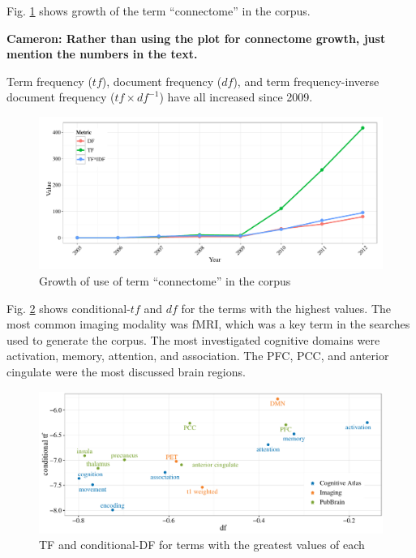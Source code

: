 \documentclass[12pt,5p]{elsarticle}
\newcommand\MyCBox[1]{%
  \colorbox{yellow!60}{\begin{varwidth}{\dimexpr\linewidth-2\fboxsep}#1\end{varwidth}}}
\newcommand{\COMMENTCC}[1]{\MyCBox{\textcolor{cc_commentcolor}{\textbf{Cameron:
#1}}}}
\begin{document}
Fig. \ref{fig:connectome_growth} shows growth of the term ``connectome'' in the
corpus. \COMMENTCC{Rather than using the plot for connectome growth, just
	mention the numbers in the text.} Term frequency ($t\!f$), document
frequency ($d\!f$), and term frequency-inverse document frequency ($t\!f \times
d\!f^{-1}$) have all increased since 2009.  

\begin{figure}
  \begin{center}
    \includegraphics[width=\linewidth]{figures/connectome_growth}%
    \caption{Growth of use of term ``connectome'' in the corpus
        \label{fig:connectome_growth}
    }
  \end{center}
\end{figure}

Fig. \ref{fig:tfidf_top} shows conditional-$t\!f$ and $d\!f$ for the
terms with the highest values. The most common imaging modality was fMRI,
which was a key term in the searches used to generate the corpus. The most
investigated cognitive domains were activation, memory, attention, and
association. The PFC, PCC, and anterior cingulate were the most discussed
brain regions. 

\begin{figure}
  \begin{center}
    \includegraphics[]{figures/tfidf_top}%
    \caption{TF and conditional-DF for terms with the greatest values of each
    \label{fig:tfidf_top}
    }
  \end{center}
\end{figure}
\end{document}
